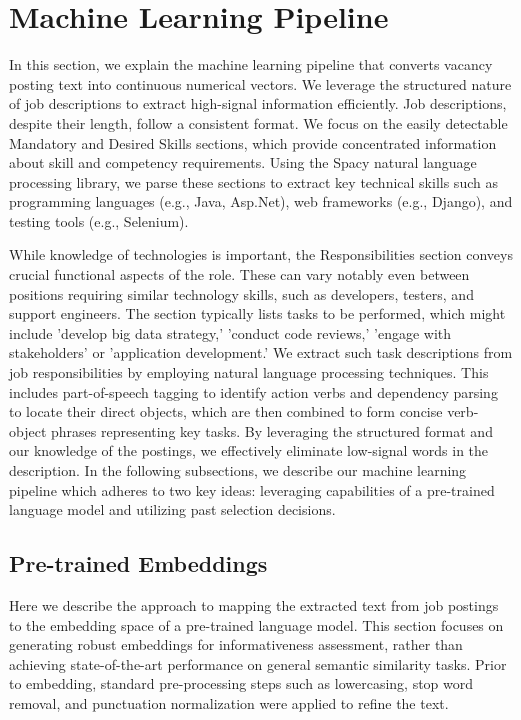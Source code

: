 
\section{Machine Learning Pipeline}\label{sec:machine_learning_pipeline}

In this section, we explain the machine learning pipeline that converts vacancy posting text into continuous numerical 
vectors. We leverage the structured nature of job descriptions to extract high-signal information efficiently. Job 
descriptions, despite their length, follow a consistent format. We focus on the easily detectable Mandatory and 
Desired Skills sections, which provide concentrated information about skill and competency requirements. Using the 
Spacy natural language processing library, we parse these sections to extract key technical skills such as programming 
languages (e.g., Java, Asp.Net), web frameworks (e.g., Django), and testing tools (e.g., Selenium).

While knowledge of technologies is important, the Responsibilities section conveys crucial functional aspects of the 
role. These can vary notably even between positions requiring similar technology skills, such as developers, testers, 
and support engineers. The section typically lists tasks to be performed, which might include 'develop big data strategy,' 
'conduct code reviews,' 'engage with stakeholders' or 'application development.' We extract such task descriptions from 
job responsibilities by employing natural language processing techniques. This includes part-of-speech tagging to identify 
action verbs and dependency parsing to locate their direct objects, which are then combined to form concise verb-object 
phrases representing key tasks. By leveraging the structured format and our knowledge of the postings, we effectively 
eliminate low-signal words in the description. In the following subsections, we describe our machine learning pipeline 
which adheres to two key ideas: leveraging capabilities of a pre-trained language model and utilizing past selection 
decisions. 

\subsection{Pre-trained Embeddings}
Here we describe the approach to mapping the extracted text from job postings to the embedding space of 
a pre-trained language model. This section focuses on generating robust embeddings for informativeness 
assessment, rather than achieving state-of-the-art performance on general semantic similarity tasks. 
Prior to embedding, standard pre-processing steps such as lowercasing, stop word removal, and punctuation 
normalization were applied to refine the text.

